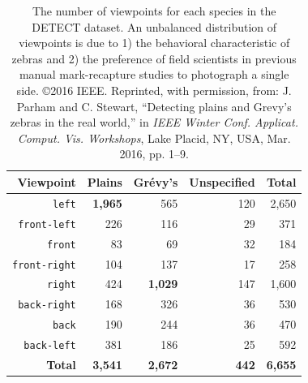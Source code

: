 \begin{table}[!t]
    \caption{The number of viewpoints for each species in the DETECT dataset.  An unbalanced distribution of viewpoints is due to 1) the behavioral characteristic of zebras and 2) the preference of field scientists in previous manual mark-recapture studies to photograph a single side.  \copyright 2016 IEEE. Reprinted, with permission, from: J. Parham and C. Stewart, ``Detecting plains and Grevy’s zebras in the real world,'' in \textit{IEEE Winter Conf. Applicat. Comput. Vis. Workshops}, Lake Placid, NY, USA, Mar. 2016, pp. 1–9.}
    \label{tab:distributions}
    \begin{center}
        \begin{tabular}{r|rrr|r}
            \hline
            \textbf{Viewpoint}   & \textbf{Plains} & \textbf{Gr\'evy's} & \textbf{Unspecified} & \textbf{Total} \\
            \hline
            \texttt{left}        & \textbf{1,965}  & 565                & 120                  & 2,650          \\
            \texttt{front-left}  & 226             & 116                & 29                   & 371            \\
            \texttt{front}       & 83              & 69                 & 32                   & 184            \\
            \texttt{front-right} & 104             & 137                & 17                   & 258            \\
            \texttt{right}       & 424             & \textbf{1,029}     & 147                  & 1,600          \\
            \texttt{back-right}  & 168             & 326                & 36                   & 530            \\
            \texttt{back}        & 190             & 244                & 36                   & 470            \\
            \texttt{back-left}   & 381             & 186                & 25                   & 592            \\
            \hline
            \textbf{Total}       & \textbf{3,541}  & \textbf{2,672}     & \textbf{442}         & \textbf{6,655}
        \end{tabular}
    \end{center}
\end{table}

